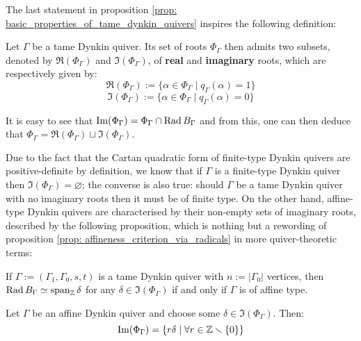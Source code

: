             The last statement in proposition \ref{prop: basic_properties_of_tame_dynkin_quivers} inspires the following definition:
            \begin{definition} \label{def: real_and_imeginary_roots_of_tame_dynkin_quivers}
                Let $\Gamma$ be a tame Dynkin quiver. Its set of roots $\Phi_{\Gamma}$ then admits two subsets, denoted by $\Re(\Phi_{\Gamma})$ and $\Im(\Phi_{\Gamma})$, of \textbf{real} and \textbf{imaginary} roots, which are respectively given by:
                    $$\Re(\Phi_{\Gamma}) := \{\alpha \in \Phi_{\Gamma} \mid q_{\Gamma}(\alpha) = 1\}$$
                    $$\Im(\Phi_{\Gamma}) := \{\alpha \in \Phi_{\Gamma} \mid q_{\Gamma}(\alpha) = 0\}$$
            \end{definition}    
            \begin{remark} \label{remark: roots_are_zero_real_or_imaginary}
                It is easy to see that $\operatorname{Im}(\Phi_{\Gamma}) = \Phi_{\Gamma} \cap \operatorname{Rad} B_{\Gamma}$ and from this, one can then deduce that $\Phi_{\Gamma} = \Re(\Phi_{\Gamma}) \sqcup \Im(\Phi_{\Gamma})$.
            \end{remark}
            Due to the fact that the Cartan quadratic form of finite-type Dynkin quivers are positive-definite by definition, we know that if $\Gamma$ is a finite-type Dynkin quiver then $\Im(\Phi_{\Gamma}) = \varnothing$; the converse is also true: should $\Gamma$ be a tame Dynkin quiver with no imaginary roots then it must be of finite type. On the other hand, affine-type Dynkin quivers are characterised by their non-empty sets of imaginary roots, described by the following proposition, which is nothing but a rewording of proposition \ref{prop: affineness_criterion_via_radicals} in more quiver-theoretic terms:
            \begin{proposition} \label{prop: radicals_of_tits_quadratic_forms_of_affine_dynkin_quivers}
                If $\Gamma := (\Gamma_1, \Gamma_0, s, t)$ is a tame Dynkin quiver with $n := |\Gamma_0|$ vertices, then $\operatorname{Rad} B_{\Gamma} \simeq \operatorname{span}_{\mathbb{Z}} \delta$ for any $\delta \in \Im(\Phi_{\Gamma})$ if and only if $\Gamma$ is of affine type.
            \end{proposition}
            \begin{corollary} \label{prop: imaginary_roots_of_affine_dynkin_quivers}
                Let $\Gamma$ be an affine Dynkin quiver and choose some $\delta \in \Im(\Phi_{\Gamma})$. Then:
                    $$\operatorname{Im}(\Phi_{\Gamma}) = \{r \delta \mid \forall r \in \mathbb{Z} \smallsetminus \{0\}\}$$
            \end{corollary}
            
